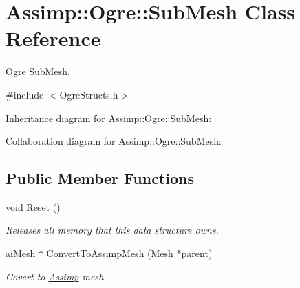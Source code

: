 \hypertarget{class_assimp_1_1_ogre_1_1_sub_mesh}{\section{Assimp\+:\+:Ogre\+:\+:Sub\+Mesh Class Reference}
\label{class_assimp_1_1_ogre_1_1_sub_mesh}
}


Ogre \hyperlink{class_assimp_1_1_ogre_1_1_sub_mesh}{Sub\+Mesh}.  




{\ttfamily \#include $<$Ogre\+Structs.\+h$>$}



Inheritance diagram for Assimp\+:\+:Ogre\+:\+:Sub\+Mesh\+:


Collaboration diagram for Assimp\+:\+:Ogre\+:\+:Sub\+Mesh\+:
\subsection*{Public Member Functions}
\begin{DoxyCompactItemize}
\item 
void \hyperlink{class_assimp_1_1_ogre_1_1_sub_mesh_a6ff3248a8b06a1143fb73d614c2e419c}{Reset} ()
\begin{DoxyCompactList}\small\item\em Releases all memory that this data structure owns. \end{DoxyCompactList}\item 
\hypertarget{class_assimp_1_1_ogre_1_1_sub_mesh_a0285de35ed113e1fe00de82e8e3c6693}{\hyperlink{structai_mesh}{ai\+Mesh} $\ast$ \hyperlink{class_assimp_1_1_ogre_1_1_sub_mesh_a0285de35ed113e1fe00de82e8e3c6693}{Convert\+To\+Assimp\+Mesh} (\hyperlink{class_assimp_1_1_ogre_1_1_mesh}{Mesh} $\ast$parent)}\label{class_assimp_1_1_ogre_1_1_sub_mesh_a0285de35ed113e1fe00de82e8e3c6693}

\begin{DoxyCompactList}\small\item\em Covert to \hyperlink{class_assimp}{Assimp} mesh. \end{DoxyCompactList}\end{DoxyCompactItemize}
